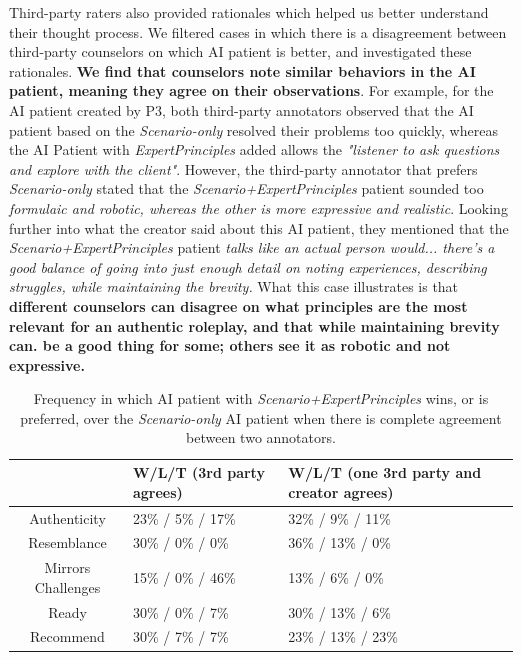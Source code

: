 \documentclass[11pt]{article}
\begin{document}
Third-party raters also provided rationales which helped us better understand their thought process. We filtered cases in which there is a disagreement between third-party counselors on which AI patient is better, and investigated these rationales. \textbf{We find that counselors note similar behaviors in the AI patient, meaning they agree on their observations}. For example, for the AI patient created by P3, both third-party annotators observed that the AI patient based on the \textit{Scenario-only} resolved their problems too quickly, whereas the AI Patient with \textit{ExpertPrinciples} added allows the \textit{"listener to ask questions and explore with the client"}. However, the third-party annotator that prefers \textit{Scenario-only} stated that the \textit{Scenario+ExpertPrinciples} patient sounded too \textit{formulaic and robotic, whereas the other is more expressive and realistic}. Looking further into what the creator said about this AI patient, they mentioned that the \textit{Scenario+ExpertPrinciples} patient \textit{talks like an actual person would... there's a good balance of going into just enough detail on noting experiences, describing struggles, while maintaining the brevity.} What this case illustrates is that \textbf{different counselors can disagree on what principles are the most relevant for an authentic roleplay, and that while maintaining brevity can. be a good thing for some; others see it as robotic and not expressive.}   


\begin{table}[t]
    \centering
    \begin{tabular}{|c|l|l|} \hline  
         &  W/L/T (3rd party agrees)&W/L/T (one 3rd party and creator agrees)\\ \hline 
         Authenticity&  23\% / 5\% / 17\% &32\% / 9\% / 11\% \\ \hline 
         Resemblance&   30\% / 0\% / 0\%&36\% / 13\% / 0\%\\ \hline 
         Mirrors Challenges&   15\% / 0\%  / 46\%&13\% / 6\% / 0\%\\ \hline 
         Ready&   30\% / 0\% / 7\%&30\% / 13\% / 6\%\\ \hline 
         Recommend&   30\% / 7\% / 7\%&23\% / 13\% / 23\%\\ \hline
    \end{tabular}
    \caption{Frequency in which AI patient with \textit{Scenario+ExpertPrinciples} wins, or is preferred, over the \textit{Scenario-only} AI patient when there is complete agreement between two annotators.}
    \label{tab:thirdparty_wlt}
\end{table}
\end{document}
